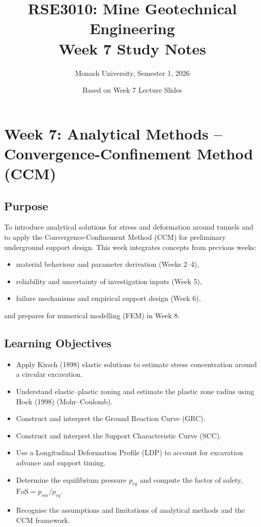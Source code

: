 \documentclass[a4paper,12pt]{article}
\title{\textbf{RSE3010: Mine Geotechnical Engineering} \\ Week 7 Study Notes}
\author{Monash University, Semester 1, 2026}
\date{Based on Week 7 Lecture Slides}
\begin{document}
\maketitle

\section{Week 7: Analytical Methods -- Convergence-Confinement Method (CCM)}

\subsection{Purpose}
To introduce analytical solutions for stress and deformation around tunnels and to apply the Convergence-Confinement Method (CCM) for preliminary underground support design. This week integrates concepts from previous weeks:
\begin{itemize}
    \item material behaviour and parameter derivation (Weeks 2--4),
    \item reliability and uncertainty of investigation inputs (Week 5),
    \item failure mechanisms and empirical support design (Week 6),
\end{itemize}
and prepares for numerical modelling (FEM) in Week 8.

\subsection{Learning Objectives}
\begin{itemize}
    \item Apply Kirsch (1898) elastic solutions to estimate stress concentration around a circular excavation.
    \item Understand elastic--plastic zoning and estimate the plastic zone radius using Hoek (1998) (Mohr--Coulomb).
    \item Construct and interpret the Ground Reaction Curve (GRC).
    \item Construct and interpret the Support Characteristic Curve (SCC).
    \item Use a Longitudinal Deformation Profile (LDP) to account for excavation advance and support timing.
    \item Determine the equilibrium pressure $p_{eq}$ and compute the factor of safety, $\text{FoS} = p_{sm}/p_{eq}$.
    \item Recognise the assumptions and limitations of analytical methods and the CCM framework.
\end{itemize}
\end{document}
